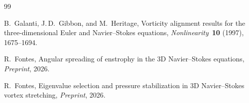 \documentclass[11pt,a4paper]{article}
\theoremstyle{plain}
\theoremstyle{definition}
\theoremstyle{remark}
\begin{document}
\begin{thebibliography}{99}

B.~Galanti, J.\,D.~Gibbon, and M.~Heritage,
Vorticity alignment results for the three-dimensional
Euler and Navier--Stokes equations,
\emph{Nonlinearity}~\textbf{10} (1997), 1675--1694.

R.~Fontes,
Angular spreading of enstrophy in the 3D Navier--Stokes
equations,
\emph{Preprint}, 2026.

R.~Fontes,
Eigenvalue selection and pressure stabilization in
3D Navier--Stokes vortex stretching,
\emph{Preprint}, 2026.

\end{thebibliography}
\end{document}
